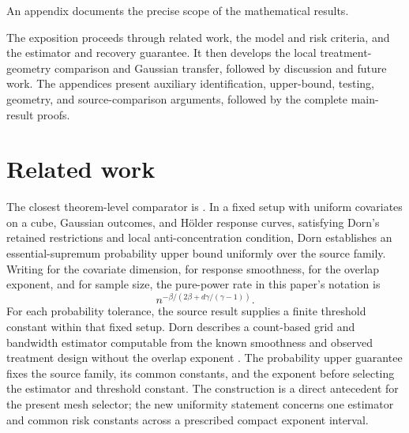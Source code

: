 \documentclass[11pt]{article}
\begin{document}
An appendix documents the precise scope of the mathematical results.

The exposition proceeds through related work, the model and risk criteria, and the estimator and recovery guarantee. It then develops the local treatment-geometry comparison and Gaussian transfer, followed by discussion and future work. The appendices present auxiliary identification, upper-bound, testing, geometry, and source-comparison arguments, followed by the complete main-result proofs.


\section{Related work}

The closest theorem-level comparator is \citet[Assumptions 1--3 and Theorem 1(ii), p. 12]{Dorn2026GlobalOverlap}. In a fixed setup with uniform covariates on a cube, Gaussian outcomes, and Hölder response curves, satisfying Dorn's retained restrictions and local anti-concentration condition, Dorn establishes an essential-supremum probability upper bound uniformly over the source family. Writing  for the covariate dimension,  for response smoothness,  for the overlap exponent, and  for sample size, the pure-power rate in this paper's notation is
\[
n^{-\beta/(2\beta+d\gamma/(\gamma-1))}.
\]
For each probability tolerance, the source result supplies a finite threshold constant within that fixed setup. Dorn describes a count-based grid and bandwidth estimator computable from the known smoothness and observed treatment design without the overlap exponent \citep[Lemmas 11 and 13, pp. 23--24; proof, pp. 27--28]{Dorn2026GlobalOverlap}. The probability upper guarantee fixes the source family, its common constants, and the exponent before selecting the estimator and threshold constant. The construction is a direct antecedent for the present mesh selector; the new uniformity statement concerns one estimator and common risk constants across a prescribed compact exponent interval.
\end{document}
